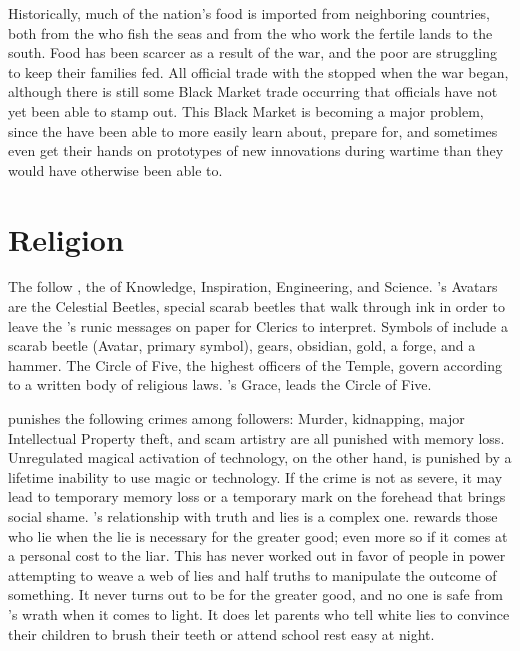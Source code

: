 \documentclass[blue]{GL2020}
\begin{document}
Historically, much of the nation's food is imported from neighboring countries, both from the \pShippies{} who fish the seas and from the \pFarmers{} who work the fertile lands to the south. Food has been scarcer as a result of the war, and the poor are struggling to keep their families fed. All official trade with the \pShippies{} stopped when the war began, although there is still some Black Market trade occurring that officials have not yet been able to stamp out. This Black Market is becoming a major problem, since the \pShippies{} have been able to more easily learn about, prepare for, and sometimes even get their hands on prototypes of new \pTech{} innovations during wartime than they would have otherwise been able to.

\section*{Religion}
The \pTechies{} follow \cTechGod{}, the \cTechGod{\Deity} of Knowledge, Inspiration, Engineering, and Science. \cTechGod{}'s Avatars are the Celestial Beetles, special scarab beetles that walk through ink in order to leave the \cTechGod{\Deity}'s runic messages on paper for Clerics to interpret. Symbols of \cTechGod{} include a scarab beetle (Avatar, primary symbol), gears, obsidian, gold, a forge, and a hammer. The Circle of Five, the highest officers of the Temple, govern according to a written body of religious laws. \cTechGod{}’s Grace, \cAntiChup{\full} leads the Circle of Five. 

\cTechGod{} punishes the following crimes among \cTechGod{\their} followers: Murder, kidnapping, major Intellectual Property theft, and scam artistry are all punished with memory loss. Unregulated magical activation of technology, on the other hand, is punished by a lifetime inability to use magic or technology. If the crime is not as severe, it may lead to temporary memory loss or a temporary mark on the forehead that brings social shame. \cTechGod{}’s relationship with truth and lies is a complex one. \cTechGod{} rewards those who lie when the lie is necessary for the greater good; even more so if it comes at a personal cost to the liar. This has never worked out in favor of people in power attempting to weave a web of lies and half truths to manipulate the outcome of something. It never turns out to be for the greater good, and no one is safe from \cTechGod{}’s wrath when it comes to light. It does let parents who tell white lies to convince their children to brush their teeth or attend school rest easy at night. 
\end{document}
